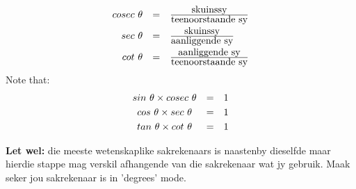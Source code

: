 \begin{equation*}
\begin{array}{ccc}\hfill cosec~\theta & =& \frac{\mbox{skuinssy}}{\mbox{teenoorstaande sy}}\hfill \vspace{3pt}\\
 \hfill sec~\theta & =& \frac{\mbox{skuinssy}}{\mbox{aanliggende sy}}\hfill \vspace{3pt}\\
 \hfill cot~\theta & =& \frac{\mbox{aanliggende sy}}{\mbox{teenoorstaande sy}}\hfill 
\end{array}
\end{equation*}
Note that:
\begin{equation*}
\begin{array}{ccc}sin~\theta \times cosec~\theta & =& 1 \vspace{3pt}\\
 cos~\theta \times sec~\theta & =& 1 \vspace{3pt}\\
tan~\theta \times cot~\theta & =& 1
\end{array}
\end{equation*}


% 
% 
\textbf{Let wel: }die meeste wetenskaplike sakrekenaars is naastenby dieselfde maar hierdie stappe mag verskil afhangende van die sakrekenaar wat jy gebruik. Maak seker jou sakrekenaar is in 'degrees' mode. 

